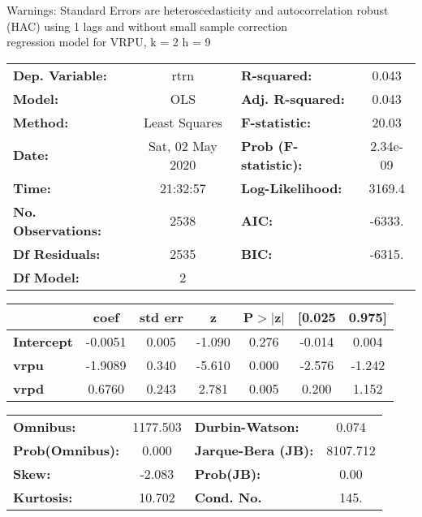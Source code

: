 Warnings: \newline
 [1] Standard Errors are heteroscedasticity and autocorrelation robust (HAC) using 1 lags and without small sample correction\\ 

regression model for VRPU, k = 2 h = 9\begin{center}
\begin{tabular}{lclc}
\toprule
\textbf{Dep. Variable:}    &       rtrn       & \textbf{  R-squared:         } &     0.043   \\
\textbf{Model:}            &       OLS        & \textbf{  Adj. R-squared:    } &     0.043   \\
\textbf{Method:}           &  Least Squares   & \textbf{  F-statistic:       } &     20.03   \\
\textbf{Date:}             & Sat, 02 May 2020 & \textbf{  Prob (F-statistic):} &  2.34e-09   \\
\textbf{Time:}             &     21:32:57     & \textbf{  Log-Likelihood:    } &    3169.4   \\
\textbf{No. Observations:} &        2538      & \textbf{  AIC:               } &    -6333.   \\
\textbf{Df Residuals:}     &        2535      & \textbf{  BIC:               } &    -6315.   \\
\textbf{Df Model:}         &           2      & \textbf{                     } &             \\
\bottomrule
\end{tabular}
\begin{tabular}{lcccccc}
                   & \textbf{coef} & \textbf{std err} & \textbf{z} & \textbf{P$> |$z$|$} & \textbf{[0.025} & \textbf{0.975]}  \\
\midrule
\textbf{Intercept} &      -0.0051  &        0.005     &    -1.090  &         0.276        &       -0.014    &        0.004     \\
\textbf{vrpu}      &      -1.9089  &        0.340     &    -5.610  &         0.000        &       -2.576    &       -1.242     \\
\textbf{vrpd}      &       0.6760  &        0.243     &     2.781  &         0.005        &        0.200    &        1.152     \\
\bottomrule
\end{tabular}
\begin{tabular}{lclc}
\textbf{Omnibus:}       & 1177.503 & \textbf{  Durbin-Watson:     } &    0.074  \\
\textbf{Prob(Omnibus):} &   0.000  & \textbf{  Jarque-Bera (JB):  } & 8107.712  \\
\textbf{Skew:}          &  -2.083  & \textbf{  Prob(JB):          } &     0.00  \\
\textbf{Kurtosis:}      &  10.702  & \textbf{  Cond. No.          } &     145.  \\
\bottomrule
\end{tabular}
\end{center}

